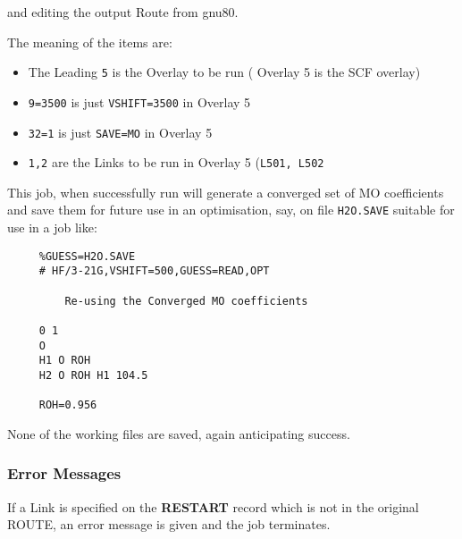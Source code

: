 and editing the output Route from gnu80.

The meaning of the items are:
\begin{itemize}
\item
The Leading {\tt 5} is the Overlay to be run ( Overlay 5 is the
SCF overlay)
\item
{\tt 9=3500} is just {\tt VSHIFT=3500} in Overlay 5
\item
{\tt 32=1} is just {\tt SAVE=MO} in Overlay 5
\item
{\tt 1,2} are the Links to be run in Overlay 5 ({\tt L501, L502}
\end{itemize}
This job, when successfully run will generate a converged set 
of MO coefficients and save them for future use in an optimisation, say,
on file {\tt H2O.SAVE} suitable for use in a job like:
\newpage
\begin{verbatim}
     %GUESS=H2O.SAVE
     # HF/3-21G,VSHIFT=500,GUESS=READ,OPT

         Re-using the Converged MO coefficients

     0 1
     O
     H1 O ROH
     H2 O ROH H1 104.5

     ROH=0.956

\end{verbatim}
      
None of the working files are saved, again anticipating success.
\subsubsection{Error Messages}
If a Link is specified on the {\bf RESTART} record which is
not in the original ROUTE, an error message is given and the job terminates.


